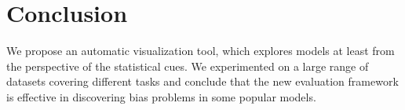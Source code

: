 \section{Conclusion}
We propose an automatic visualization tool, 
which explores models at least from the perspective of the statistical cues. 
We experimented on a large range of datasets covering different tasks and 
conclude that the new evaluation framework is effective in discovering
bias problems in some popular models.
